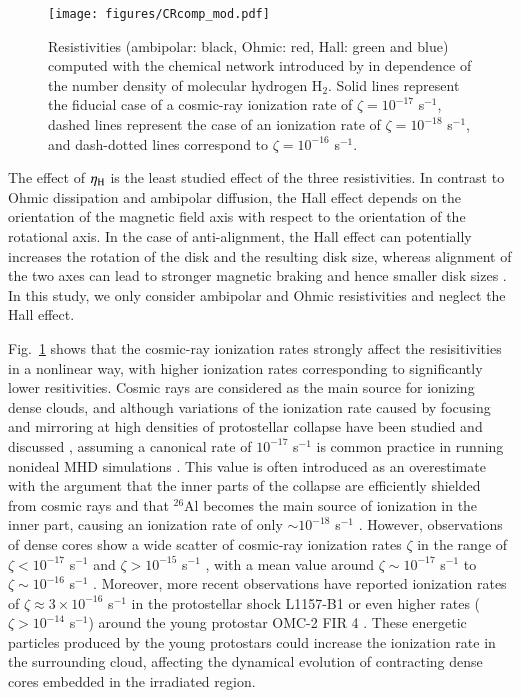 \documentclass{aa}
\newcommand{\Fig}[1]{Fig.~\ref{fig:#1}}    %
\begin{document}
\begin{figure}
        \centering
    \texttt{[image: figures/CRcomp\_mod.pdf]}
        \caption{Resistivities (ambipolar: black, Ohmic: red, Hall: green and blue) computed with the chemical network introduced by \citet{Zhao2016} in dependence of the number density of molecular hydrogen H$_2$. 
        Solid lines represent the fiducial case of a cosmic-ray ionization rate of $\zeta = 10^{-17}$ s$^{-1}$, 
        dashed lines represent the case of an ionization rate of $\zeta=10^{-18}$ s$^{-1}$, and dash-dotted lines correspond to $\zeta=10^{-16}$ s$^{-1}$.}
        \label{fig:etadensity}
\end{figure}

The effect of $\eta_{\rm H}$ is the least studied effect of the three resistivities.
In contrast to Ohmic dissipation and ambipolar diffusion, the Hall effect depends on the orientation of the magnetic field
axis with respect to the orientation of the rotational axis. 
In the case of anti-alignment, the Hall effect can potentially increases the rotation of the disk and the resulting disk size, 
whereas alignment of the two axes can lead to stronger magnetic braking and hence smaller disk sizes \citep{Tsukamoto2015b,Marchand2018}.
In this study, we only consider ambipolar and Ohmic resistivities and neglect the Hall effect. 

\Fig{etadensity} shows that the cosmic-ray ionization rates strongly affect the resisitivities in a nonlinear way, with higher ionization rates 
corresponding to significantly lower resitivities. 
Cosmic rays are considered as the main source for ionizing dense clouds, and although variations of the ionization rate caused by focusing and mirroring
at high densities of protostellar collapse have been studied and discussed \citep{PadovaniGalli2011,Silsbee2018}, 
assuming a canonical rate of $10^{-17}$ s$^{-1}$ is common practice in running nonideal MHD simulations \citep[cf.][]{Tomida2015,Vaytet2018}.
This value is often introduced as an overestimate with the argument that the inner parts of the collapse are efficiently shielded from cosmic rays 
and that $^{26}$Al becomes the main source of ionization in the inner part, causing an ionization rate of only $\sim10^{-18}$ s$^{-1}$ \citep{Umebayashi2009}. 
However, observations of dense cores show a wide scatter of cosmic-ray ionization rates $\zeta$ in the range of $\zeta < 10^{-17}$ s$^{-1}$ and 
$\zeta > 10^{-15}$ s$^{-1}$ , with a mean value around $\zeta \sim 10^{-17}$ s$^{-1}$ to $\zeta \sim 10^{-16}$ s$^{-1}$ \citep[see Figure 15 in][with  data from \cite{Caselli1998}]{Padovani2009}.  
Moreover, more recent observations have reported ionization rates of $\zeta\approx3\times 10^{-16}$ s$^{-1}$ in the protostellar shock L1157-B1 \citep{Podio2014}
or even higher rates ($\zeta > 10^{-14}$ s$^{-1}$) around the young protostar OMC-2 FIR 4 \citep{Ceccarelli2014,Fontani2017,Favre2018}. 
These energetic particles produced by the young protostars could increase the ionization rate in the surrounding cloud, affecting the dynamical evolution of contracting dense cores embedded in the irradiated region.
\end{document}
